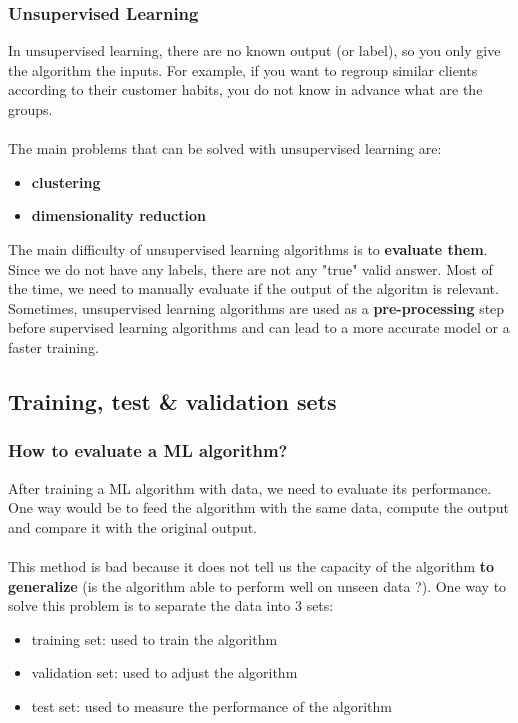 \documentclass{beamer}
\begin{document}
\begin{frame}
  \frametitle{Unsupervised Learning}
  In unsupervised  learning, there are no known output (or label), so you only
  give the algorithm the inputs. For example, if you want to regroup similar
  clients according to their customer habits, you do not know in advance what
  are the groups.\\~\\

  The main problems that can be solved with unsupervised learning are:
  \begin{itemize}
    \item \textbf{clustering}
    \item \textbf{dimensionality reduction}
  \end{itemize}

  The main difficulty of unsupervised learning algorithms is to \textbf{evaluate
  them}. Since we do not have any labels, there are not any "true" valid answer.
  Most of the time, we need to manually evaluate if the output of the algoritm
  is relevant. Sometimes, unsupervised learning algorithms are used as a
  \textbf{pre-processing} step before supervised learning algorithms and can
  lead to a more accurate model or a faster training.
\end{frame}

\subsection{Training, test \& validation sets}
\begin{frame}
  \frametitle{How to evaluate a ML algorithm?}
  After training a ML algorithm with data, we need to evaluate its performance.
  One way would be to feed the algorithm with the same data, compute the output
  and compare it with the original output.\\~\\

  This method is bad because it does not tell us the capacity of the algorithm
  \textbf{to generalize} (is the algorithm able to perform well on unseen data
  ?). One way to solve this problem is to separate the data into 3 sets:
  \begin{itemize}
    \item training set: used to train the algorithm
    \item validation set: used to adjust the algorithm
    \item test set: used to measure the performance of the algorithm
  \end{itemize}
\end{frame}
\end{document}
